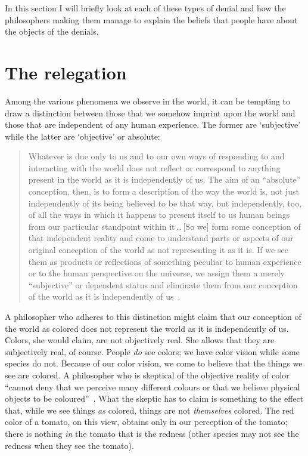 \documentclass[11pt]{article}
\newenvironment{squote}{\begin{quote}\begin{singlespace}}{\end{singlespace}\end{quote}}
\begin{document}
\begin{spacing}{1.5}
In this section I will briefly look at each of these types of denial and how the philosophers making them manage to explain the beliefs that people have about the objects of the denials.

\section{The relegation}
\label{relegate}
Among the various phenomena we observe in the world, it can be tempting to draw a distinction between those that we somehow imprint upon the world and those that are independent of any human experience. The former are `subjective' while the latter are `objective' or absolute:
\begin{squote}
Whatever is due only to us and to our own ways of responding to and interacting with the world does not reflect or correspond to anything present in the world as it is independently of us. The aim of an ``absolute'' conception, then, is to form a description of the way the world is, not just independently of its being believed to be that way, but independently, too, of all the ways in which it happens to present itself to us human beings from our particular standpoint within it\,\ldots\,[So we] form some conception of that independent reality and come to understand parts or aspects of our original conception of the world as not representing it as it is. If we see them as products or reflections of something peculiar to human experience or to the human perspective on the universe, we assign them a merely ``subjective'' or dependent status and eliminate them from our conception of the world as it is independently of us~\citep[30--31]{stroud2000a}.
\end{squote}

A philosopher who adheres to this distinction might claim that our conception of the world as colored does not represent the world as it is independently of us. Colors, she would claim, are not objectively real. She allows that they are subjectively real, of course. People {\em do} see colors; we have color vision while some species do not. Because of our color vision, we come to believe that the things we see are colored. A philosopher who is skeptical of the objective reality of color ``cannot deny that we perceive many different colours or that we believe physical objects to be coloured''~\citep[145]{stroud2000a}. What the skeptic has to claim is something to the effect that, while we see things {\em as} colored, things are not {\em themselves} colored. The red color of a tomato, on this view, obtains only in our perception of the tomato; there is nothing {\em in} the tomato that is the redness (other species may not see the redness when they see the tomato).%


\end{spacing}
\end{document}
